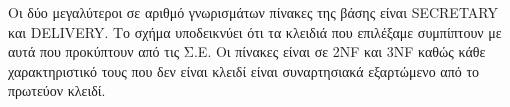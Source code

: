 Οι δύο μεγαλύτεροι σε αριθμό γνωρισμάτων πίνακες της βάσης είναι \foreignlanguage{english}{SECRETARY} και \foreignlanguage{english}{DELIVERY}. Το σχήμα υποδεικνύει ότι τα κλειδιά που επιλέξαμε συμπίπτουν με αυτά που προκύπτουν από τις Σ.Ε. Οι πίνακες είναι σε \foreignlanguage{english}{2NF} και \foreignlanguage{english}{3NF} καθώς κάθε χαρακτηριστικό τους που δεν είναι κλειδί είναι συναρτησιακά εξαρτώμενο από το πρωτεύον κλειδί.